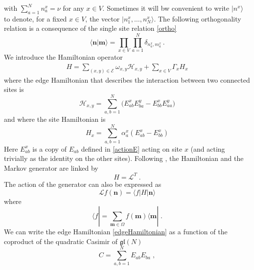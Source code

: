 \documentclass[10pt]{article}
\numberwithin{equation}{section}
\numberwithin{equation}{subsection}
\newcommand{\co}{\;,}
\newcommand{\dt}{\;.}
\begin{document}
with $\sum_{a=1}^{N}n_{a}^{x}=\nu$ for any $x\in V$. Sometimes it will bw convenient to write $|n^{x}\rangle$ to denote, for a fixed $x\in V$, the vector $|n_{1}^{x},\ldots,n_{N}^{x}\rangle$.
The following orthogonality relation is a consequence of the single site relation \eqref{ortho}
\begin{equation}
    \langle {\bm{n}}|{\bm{m}}\rangle =\prod_{x\in V}\prod_{a=1}^N\delta_{n^x_a,m^{x}_a}\,.
\end{equation}
We introduce the Hamiltonian operator
\begin{equation}\label{OriginalHamiltonian}
	\begin{split}
		H=\sum_{(x,y)\in \mathcal{E}}\omega_{x,y}\mathcal{H}_{x,y}+\sum_{x\in V}\Gamma_{x}H_{x}
	\end{split}
\end{equation}
where the edge Hamiltonian that describes the interaction between two connected sites is
\begin{equation}\label{edgeHamiltonian}
\mathcal{H}_{x,y}=\sum_{a,b=1}^{N}\Big(E_{ab}^{x} E_{b a}^{y}-E_{bb}^{x} E_{aa}^{y}\Big)
 \end{equation}
  and where the site Hamiltonian is
 \begin{equation}\label{siteHamiltonian}
H_{x}=\sum_{a,b=1}^{N}\alpha_{a}^{x}\left(E_{ab}^{x}-E_{bb}^{x}\right)
\end{equation}
Here $E_{ab}^{x}$ is a copy of $E_{ab}$ defined in \eqref{actionE} acting on site $x$ (and
acting trivially as the identity on the other sites). 
Following  \cite{belitsky2015self}, the Hamiltonian and the Markov generator are linked by
\begin{equation}\label{Hamiltonian-Generator}
H=\mathcal{L}^{T}\dt
\end{equation}
The action of the generator can also be expressed as 
\begin{equation}
    \mathcal{L}f( {\bm{n}})=\langle f|H| {\bm{n}}\rangle
\end{equation}
where 
\begin{equation}
    \langle f|=\sum_{ {{\bm{m}}\in \Omega}}f( {\bm{m}})\langle  {\bm{m}}|\dt
\end{equation}
We can write the edge Hamiltonian \eqref{edgeHamiltonian} as a function of the coproduct of the quadratic Casimir of $\mathfrak{gl}(N)$
\begin{equation}\label{secondCasimir}
    C=\sum_{a,b=1}^{N}E_{ab}E_{ba}\co
\end{equation}
\end{document}
